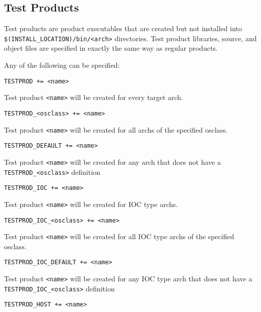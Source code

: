 \subsection{Test Products}

Test products are product executables that are created but not installed into \verb|$(INSTALL_LOCATION)/bin/<arch>| 
directories. Test product libraries, source, and object files are specified in exactly the same way as regular products. 

Any of the following can be specified:

\begin{description}

\item {}\verb|TESTPROD += <name>|

Test product \verb|<name>| will be created for every target arch.

\item \verb|TESTPROD_<osclass> += <name>|

Test product \verb|<name>| will be created for all archs of the specified osclass.

\item \verb|TESTPROD_DEFAULT += <name>|

Test product \verb|<name>| will be created for any arch that does not have a \\
\verb|TESTPROD_<osclass>| definition

\item

\item {}\verb|TESTPROD_IOC += <name>|

Test product \verb|<name>| will be created for IOC type archs.

\item \verb|TESTPROD_IOC_<osclass> += <name>|

Test product \verb|<name>| will be created for all IOC type archs of the specified osclass.

\item \verb|TESTPROD_IOC_DEFAULT += <name>|

Test product \verb|<name>| will be created for any IOC type arch that does not have a \\
\verb|TESTPROD_IOC_<osclass>| definition

\item

\item {}\verb|TESTPROD_HOST += <name>|


\end{description}
